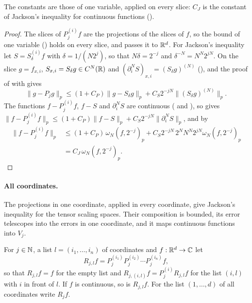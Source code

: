 The constants are those of one variable, applied on every slice: $C_J$ is the constant of
Jackson's inequality for continuous functions ().

\begin{proof}
\leanok
{}
The slices of $P^{(i)}_j f$ are the projections of the slices of $f$, so the bound of one
variable () holds on every slice, and 
passes it to $\mathbb{R}^d$. For Jackson's inequality let $S = S^{(i)}_\delta f$ with
$\delta = 1/(N 2^j)$, so that $N\delta = 2^{-j}$ and $\delta^{-N} = N^N 2^{jN}$. On the slice
$g = f_{x,i}$, $S_{x,i} = S_\delta g \in C^N(\mathbb{R})$ and $(\partial_i^N S)_{x,i} = (S_\delta g)^{(N)}$
(), and the proof of  with
 gives
\[
  \|g - P_j g\|_p \leq (1 + C_P) \|g - S_\delta g\|_p
    + C_S 2^{-jN} \|(S_\delta g)^{(N)}\|_p .
\]
The functions $f - P^{(i)}_j f$, $f - S$ and $\partial_i^N S$ are continuous
( and ), so 
gives $\|f - P^{(i)}_j f\|_p \leq (1 + C_P) \|f - S\|_p + C_S 2^{-jN} \|\partial_i^N S\|_p$, and
by 
\begin{align*}
  \|f - P^{(i)}_j f\|_p
  &\leq (1 + C_P) \, \omega_N(f, 2^{-j})_p
    + C_S 2^{-jN} \, 2^N N^N 2^{jN} \omega_N(f, 2^{-j})_p \\
  &= C_J \, \omega_N(f, 2^{-j})_p .
\end{align*}
\end{proof}

\paragraph{All coordinates.}
The projections in one coordinate, applied in every coordinate, give Jackson's inequality for the
tensor scaling spaces. Their composition is bounded, its error telescopes into the errors in one
coordinate, and it maps continuous functions into $V_j$.

\begin{definition}
\label{def:daub-rd-fold-proj}
\leanok
{}
For $j \in \mathbb{N}$, a list $l = (i_1, \dots, i_n)$ of coordinates and $f : \mathbb{R}^d \to \mathbb{C}$ let
\[
  R_{j,l} f = P^{(i_1)}_j P^{(i_2)}_j \cdots P^{(i_n)}_j f ,
\]
so that $R_{j,l} f = f$ for the empty list and $R_{j,(i,l)} f = P^{(i)}_j R_{j,l} f$ for the list
$(i, l)$ with $i$ in front of $l$. If $f$ is continuous, so is $R_{j,l} f$. For the list
$(1, \dots, d)$ of all coordinates write $R_j f$.
\end{definition}

